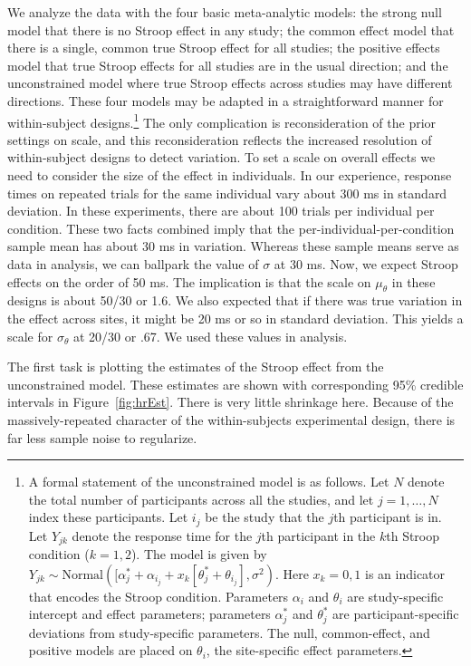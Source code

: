 \documentclass[english,man]{apa6}
\theoremstyle{definition}
\theoremstyle{definition}
\theoremstyle{definition}
\theoremstyle{remark}
\begin{document}
We analyze the data with the four basic meta-analytic models: the strong
null model that there is no Stroop effect in any study; the common
effect model that there is a single, common true Stroop effect for all
studies; the positive effects model that true Stroop effects for all
studies are in the usual direction; and the unconstrained model where
true Stroop effects across studies may have different directions. These
four models may be adapted in a straightforward manner for
within-subject designs.\footnote{A formal statement of the unconstrained
  model is as follows. Let \(N\) denote the total number of participants
  across all the studies, and let \(j=1,\ldots,N\) index these
  participants. Let \(i_j\) be the study that the \(j\)th participant is
  in. Let \(Y_{jk}\) denote the response time for the \(j\)th
  participant in the \(k\)th Stroop condition (\(k=1,2\)). The model is
  given by
  \(Y_{jk}\sim \mbox{Normal}([\alpha^*_j+\alpha_{i_j}+x_k[\theta^*_j+\theta_{i_j}],\sigma^2)\).
  Here \(x_k=0,1\) is an indicator that encodes the Stroop condition.
  Parameters \(\alpha_i\) and \(\theta_i\) are study-specific intercept
  and effect parameters; parameters \(\alpha^*_j\) and \(\theta^*_j\)
  are participant-specific deviations from study-specific parameters.
  The null, common-effect, and positive models are placed on
  \(\theta_i\), the site-specific effect parameters.} The only
complication is reconsideration of the prior settings on scale, and this
reconsideration reflects the increased resolution of within-subject
designs to detect variation. To set a scale on overall effects we need
to consider the size of the effect in individuals. In our experience,
response times on repeated trials for the same individual vary about 300
ms in standard deviation. In these experiments, there are about 100
trials per individual per condition. These two facts combined imply that
the per-individual-per-condition sample mean has about 30 ms in
variation. Whereas these sample means serve as data in analysis, we can
ballpark the value of \(\sigma\) at 30 ms. Now, we expect Stroop effects
on the order of 50 ms. The implication is that the scale on
\(\mu_\theta\) in these designs is about 50/30 or 1.6. We also expected
that if there was true variation in the effect across sites, it might be
20 ms or so in standard deviation. This yields a scale for
\(\sigma_\theta\) at 20/30 or .67. We used these values in analysis.

The first task is plotting the estimates of the Stroop effect from the
unconstrained model. These estimates are shown with corresponding 95\%
credible intervals in Figure~\ref{fig:hrEst}. There is very little
shrinkage here. Because of the massively-repeated character of the
within-subjects experimental design, there is far less sample noise to
regularize.
\end{document}
